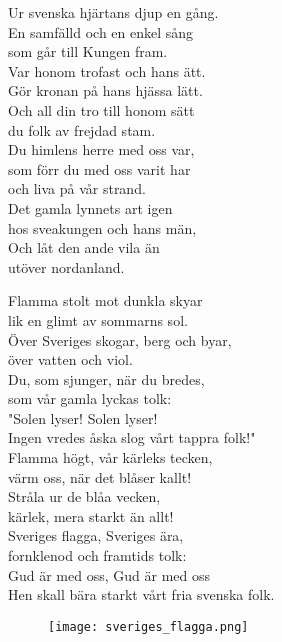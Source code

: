 \documentclass[a6paper, 10pt, twoside]{article}
\begin{document}
\begin{center}
\end{center}
\begin{lyrics}
Ur svenska hjärtans djup en gång.\\
En samfälld och en enkel sång\\
som går till Kungen fram.\\
Var honom trofast och hans ätt.\\
Gör kronan på hans hjässa lätt.\\
Och all din tro till honom sätt\\
du folk av frejdad stam.\\
\newline
Du himlens herre med oss var,\\
som förr du med oss varit har\\
och liva på vår strand.\\
Det gamla lynnets art igen\\
hos sveakungen och hans män,\\
Och låt den ande vila än\\
utöver nordanland.\\
\end{lyrics}

\begin{center}
\end{center}
\begin{lyrics}
Flamma stolt mot dunkla skyar\\
lik en glimt av sommarns sol.\\
Över Sveriges skogar, berg och byar,\\
över vatten och viol.\\
Du, som sjunger, när du bredes,\\
som vår gamla lyckas tolk:\\
"Solen lyser! Solen lyser!\\
Ingen vredes åska slog vårt tappra folk!"
\vspace{5pt}\\
Flamma högt, vår kärleks tecken,\\
värm oss, när det blåser kallt!\\
Stråla ur de blåa vecken,\\
kärlek, mera starkt än allt!\\
Sveriges flagga, Sveriges ära,\\
fornklenod och framtids tolk:\\
Gud är med oss, Gud är med oss\\
Hen skall bära starkt vårt fria svenska folk. 
\end{lyrics}
\vspace{20pt}
\begin{figure}[!h]
\centering
\texttt{[image: sveriges\_flagga.png]}
\end{figure}
\end{document}
